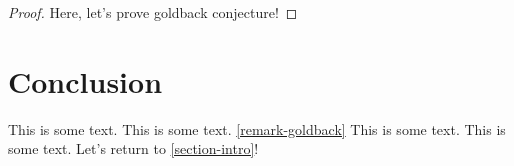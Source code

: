 \documentclass[aps,pra,superscriptaddress,longbibliography,twocolumn]{revtex4-1}
\begin{document}
\begin{proof}
Here, let's prove goldback conjecture!
\end{proof}

\section{Conclusion}
\label{section-conc}
This is some text. This is some text. \autoref{remark-goldback} This is some text. This is some text.
Let's return to \autoref{section-intro}!
\end{document}
